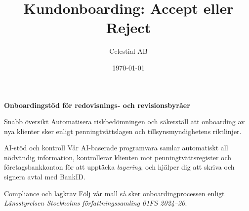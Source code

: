 \documentclass[10pt]{beamer}
\title[Kundonboarding]{Kundonboarding: Accept eller Reject}
\author[Celestial AB]{Celestial AB}
\institute{Risk \& Compliance}
\date{\today}
\begin{document}

\begin{frame}[plain]
  \begin{flushright}
    \vspace{-0.8cm}
    \hyperlink{login}{} \hspace{0.3cm}
    \hyperlink{register}{}
  \end{flushright}

  \vspace{1.2cm}
  \centering
  {\color{warmbrown}\textbf{Onboardingstöd för redovisnings- och revisionsbyråer}}

  \vspace{0.8cm}

  \begin{block}{Snabb översikt}
    Automatisera riskbedömningen och säkerställ att onboarding av nya klienter sker enligt penningtvättslagen och tillsynsmyndighetens riktlinjer.
  \end{block}

  \vspace{0.5cm}

  \begin{block}{AI-stöd och kontroll}
    Vår AI-baserade programvara samlar automatiskt all nödvändig information, kontrollerar klienten mot penningtvättsregister och företagsbankkonton för att upptäcka \textit{layering}, och hjälper dig att skriva och signera avtal med BankID.
  \end{block}

  \vspace{0.5cm}

  \begin{block}{Compliance och lagkrav}
    Följ vår mall så sker onboardingprocessen enligt \textit{Länsstyrelsen Stockholms författningssamling 01FS 2024–20}.
  \end{block}

  \vspace{0.5cm}


\end{frame}
\end{document}
